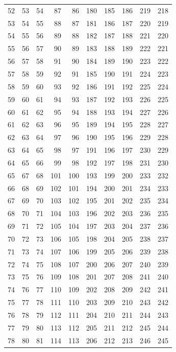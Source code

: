 \begin{longtable}{rrrrr@{\qquad}rrrrr}
52 & 53 & 54 & 87 & 86 & 180 & 185 & 186 & 219 & 218 \\
53 & 54 & 55 & 88 & 87 & 181 & 186 & 187 & 220 & 219 \\
54 & 55 & 56 & 89 & 88 & 182 & 187 & 188 & 221 & 220 \\
55 & 56 & 57 & 90 & 89 & 183 & 188 & 189 & 222 & 221 \\
56 & 57 & 58 & 91 & 90 & 184 & 189 & 190 & 223 & 222 \\
57 & 58 & 59 & 92 & 91 & 185 & 190 & 191 & 224 & 223 \\
58 & 59 & 60 & 93 & 92 & 186 & 191 & 192 & 225 & 224 \\
59 & 60 & 61 & 94 & 93 & 187 & 192 & 193 & 226 & 225 \\
60 & 61 & 62 & 95 & 94 & 188 & 193 & 194 & 227 & 226 \\
61 & 62 & 63 & 96 & 95 & 189 & 194 & 195 & 228 & 227 \\
62 & 63 & 64 & 97 & 96 & 190 & 195 & 196 & 229 & 228 \\
63 & 64 & 65 & 98 & 97 & 191 & 196 & 197 & 230 & 229 \\
64 & 65 & 66 & 99 & 98 & 192 & 197 & 198 & 231 & 230 \\
65 & 67 & 68 & 101 & 100 & 193 & 199 & 200 & 233 & 232 \\
66 & 68 & 69 & 102 & 101 & 194 & 200 & 201 & 234 & 233 \\
67 & 69 & 70 & 103 & 102 & 195 & 201 & 202 & 235 & 234 \\
68 & 70 & 71 & 104 & 103 & 196 & 202 & 203 & 236 & 235 \\
69 & 71 & 72 & 105 & 104 & 197 & 203 & 204 & 237 & 236 \\
70 & 72 & 73 & 106 & 105 & 198 & 204 & 205 & 238 & 237 \\
71 & 73 & 74 & 107 & 106 & 199 & 205 & 206 & 239 & 238 \\
72 & 74 & 75 & 108 & 107 & 200 & 206 & 207 & 240 & 239 \\
73 & 75 & 76 & 109 & 108 & 201 & 207 & 208 & 241 & 240 \\
74 & 76 & 77 & 110 & 109 & 202 & 208 & 209 & 242 & 241 \\
75 & 77 & 78 & 111 & 110 & 203 & 209 & 210 & 243 & 242 \\
76 & 78 & 79 & 112 & 111 & 204 & 210 & 211 & 244 & 243 \\
77 & 79 & 80 & 113 & 112 & 205 & 211 & 212 & 245 & 244 \\
78 & 80 & 81 & 114 & 113 & 206 & 212 & 213 & 246 & 245 \\

\end{longtable}
